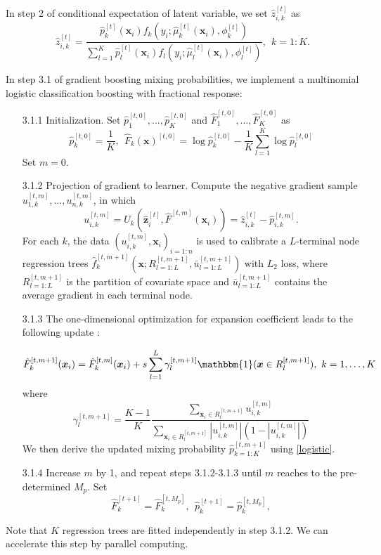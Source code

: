 \documentclass[11pt]{article}
\numberwithin{equation}{section}
\def\bx{\boldsymbol{x}}
\def\bz{\boldsymbol{z}}
\begin{document}
In step 2 of conditional expectation of latent variable, we set  $\hat{z}_{i,k}^{[t]}$ as
	\begin{equation*}
		\hat{z}_{i,k}^{[t]}=\frac{\hat{p}_{k}^{[t]}(\bx_i) f_{k}\left(y_i ; \hat{\mu}_{k}^{[t]}(\bx_i), \phi_k^{[t]} \right)}{\sum_{l=1}^{K} \hat{p}_{l}^{[t]}(\bx_i) f_{l}\left(y_i ; \hat{\mu}_{l}^{[t]}(\bx_i), \phi_l^{[t]}\right)},~~ k=1:K.
	\end{equation*}


In step 3.1 of gradient boosting mixing probabilities, we implement a  multinomial logistic classification boosting with fractional response: 
	\begin{enumerate}
		\item[3.1.1] Initialization. Set $\hat{p}_1^{[t,0]}, \ldots, \hat{p}_K^{[t,0]}$ and $\hat{F}_1^{[t,0]}, \ldots, \hat{F}_{K}^{[t,0]}$ as
		\begin{equation}\label{ini-1}			
		\hat{p}_k^{[t,0]}=\frac{1}{K},
		~~\hat{F}_k(\bx)^{[t,0]}=\log \hat{p}_k^{[t,0]}-\frac{1}{K}\sum_{l=1}^K\log \hat{p}_l^{[t,0]}
	\end{equation}
		Set $m=0$.
		\item[3.1.2] Projection of gradient to learner.
		Compute the negative gradient sample $u_{1,k}^{[t,m]},\ldots,u_{n,k}^{[t,m]}$,  in which
		$$u_{i,k}^{[t,m]}=U_k(\hat{\bz}_{i}^{[t]},\hat{F}^{[t,m]}(\bx_i))=\hat{z}_{i,k}^{[t]}-\hat{p}_{i,k}^{[t,m]}.$$
		For each $k$, the data $(u_{i,k}^{[t,m]},\bx_i)_{i=1:n}$ is used to calibrate a $L$-terminal node regression trees $\hat{f}_k^{[t,m+1]}\left(\bx;R^{[t,m+1]}_{l=1:L},\bar{u}^{[t,m+1]}_{l=1:L}\right)$ with $L_2$ loss,
		where $R^{[t,m+1]}_{l=1:L}$ is the partition of covariate space and $\bar{u}^{[t,m+1]}_{l=1:L}$ contains the average gradient in each terminal node.
		
		
	
		\item[3.1.3]  The one-dimensional optimization for expansion coefficient leads to the following update \citep{friedman2001greedy}:
		
		$$\hat{F}_k^{[t,m+1]}(\bx_i)=\hat{F}_k^{[t,m]}(\bx_i)+s\sum_{l=1}^L\gamma^{[t,m+1]}_l\mathbbm{1}(\bx\in R^{[t,m+1]}_l),~ k=1,\ldots,K$$
		where
		$$\gamma^{[t,m+1]}_l=\frac{K-1}{K}\frac{\sum_{\bx_i\in R_l^{[t,m+1]}}u_{i,k}^{[t,m]}}{\sum_{\bx_i\in R_l^{[t,m+1]}}|u_{i,k}^{[t,m]}|(1-|u_{i,k}^{[t,m]}|)}$$
		We then derive the updated mixing probability $\hat{p}^{[t,m+1]}_{k=1:K}$  using \eqref{logistic}.
		
		
	
		\item[3.1.4] Increase $m$ by 1, and repeat steps 3.1.2-3.1.3  until $m$ reaches to the pre-determined $M_p$.
		Set $$\hat{F}_k^{[t+1]}=\hat{F}_k^{[t,M_p]},~~\hat{p}_k^{[t+1]}=\hat{p}_k^{[t,M_p]},$$
	\end{enumerate}
Note that  $K$ regression trees are fitted independently in step 3.1.2. We can accelerate this step by parallel computing.
\end{document}
